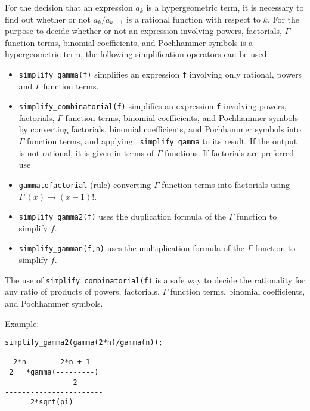 For the decision that an expression $a_k$ is a hypergeometric term, it is 
necessary to find out whether or not $a_{k}/a_{k-1}$ is a rational
function with respect to $k$. For the purpose to decide
whether or not an expression involving powers, factorials,
$\Gamma$ function terms, 
binomial coefficients, and Pochhammer symbols is a hypergeometric term,
the following simplification operators can be used:
\begin{itemize}
\item
{\tt simplify\_gamma(f)} simplifies an
expression {\tt f} involving only rational, powers and $\Gamma$
function terms.
\item
{\tt simplify\_combinatorial(f)}
simplifies an expression {\tt f} involving powers, factorials,
$\Gamma$ function terms, binomial coefficients, and Pochhammer symbols
by converting factorials, binomial coefficients, and Poch\-hammer
symbols into $\Gamma$ function terms, and applying {\tt
simplify\_gamma} to its result. If the output is not rational, it is
given in terms of $\Gamma$ functions. If factorials are preferred use
\item
{\tt gammatofactorial} (rule) converting $\Gamma$ function terms into
factorials using $\Gamma\:(x)\rightarrow (x-1)!$.
\item
{\tt simplify\_gamma2(f)}
uses the duplication formula of the $\Gamma$ function to simplify $f$.
\item
{\tt simplify\_gamman(f,n)}
uses the multiplication formula of the $\Gamma$ function to simplify $f$.
\end{itemize}
The use of {\tt simplify\_combinatorial(f)} is a safe way to
decide the rationality for any ratio of products of powers, factorials,
$\Gamma$ function terms, binomial coefficients, and Pochhammer symbols.

Example:

\begin{verbatim}
simplify_gamma2(gamma(2*n)/gamma(n));

  2*n        2*n + 1
 2   *gamma(---------)
                2
-----------------------
      2*sqrt(pi)

\end{verbatim}

